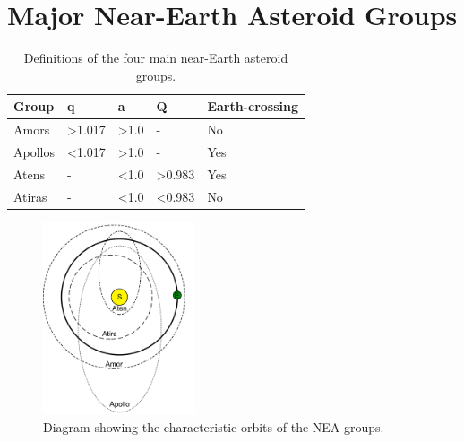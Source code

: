 \section{Major Near-Earth Asteroid Groups}
\label{sec:asteroidfamilies}

\begin{table}[htbp]
\centering
\caption{Definitions of the four main near-Earth asteroid groups.}
\label{tab:asteroidgroups}
\begin{tabular}{lllll}
\textbf{Group} & \textbf{q} & \textbf{a} & \textbf{Q} & \textbf{Earth-crossing} \\ \hline \vspace{0.25cm}
Amors          & >1.017      & >1.0        & -          & No                      \\ \vspace{0.25cm}
Apollos        & <1.017      & >1.0        & -          & Yes                     \\ \vspace{0.25cm}
Atens          & -          & <1.0        & >0.983      & Yes                     \\ \vspace{0.25cm}
Atiras         & -          & <1.0        & <0.983      & No                     
\end{tabular}
\end{table}
\newpage
\begin{figure}[htbp]
    \centering
    \includegraphics[width=0.4\textwidth]{images/groupdiagram.png}
    \caption{Diagram showing the characteristic orbits of the NEA groups.}
    \label{fig:neagrouporbits}
\end{figure}

